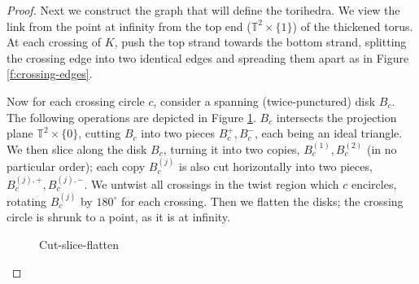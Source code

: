 \documentclass[11pt]{amsart}
\newcommand{\figref}[1]{Figure \ref{#1}}
\newcommand{\torus}{{\mathbb{T}^2}}
\theoremstyle{plain}
\theoremstyle{definition}
\begin{document}
\begin{proof}
Next we construct the graph that will define the torihedra.
We view the link from the point at infinity from the top end
($\torus \times \{1\}$) of the thickened torus.
At each crossing of $K$,
push the top strand towards the bottom strand,
splitting the crossing edge into two
identical edges and spreading them apart as in
\figref{f:crossing-edges}.
 

Now for each crossing circle $c$, consider a spanning
(twice-punctured) disk $B_c$.
The following operations are depicted in \figref{f:cut-slice-flatten}.
$B_c$ intersects the projection plane $\torus \times \{0\}$,
cutting $B_c$ into two pieces $B_c^+,B_c^-$,
each being an ideal triangle.
We then slice along the disk $B_c$, turning it into two copies,
$B_c^{(1)},B_c^{(2)}$ (in no particular order);
each copy $B_c^{(j)}$ is also cut horizontally into two pieces,
$B_c^{(j),+},B_c^{(j),-}$.
We untwist all crossings in the twist region
which $c$ encircles,
rotating $B_c^{(j)}$ by $180^\circ$ for each crossing.
Then we flatten the disks;
the crossing circle is shrunk to a point,
as it is at infinity.


\begin{figure}[ht]

\caption{Cut-slice-flatten}
\label{f:cut-slice-flatten}
\end{figure}





\end{proof}
\end{document}
